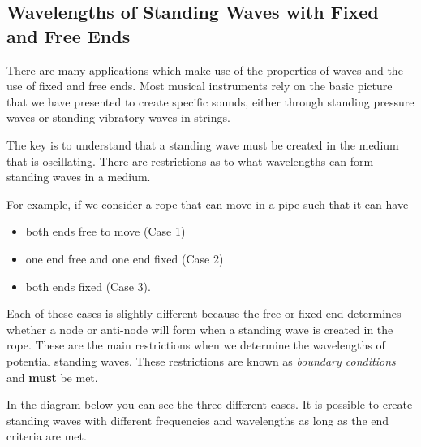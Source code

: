 



\subsection{Wavelengths of Standing Waves with Fixed and Free Ends}
There are many applications which make use of the properties of waves
and the use of fixed and free ends. Most musical instruments rely on
the basic picture that we have presented to create specific sounds,
either through standing pressure waves or standing vibratory waves in
strings.

The key is to understand that a standing wave must be created in the
medium that is oscillating. There are restrictions as to what
wavelengths can form standing waves in a medium.

For example, if we consider a rope that can move in a pipe such that it can have
\begin{itemize}
\item both ends free to move (Case 1)
\item one end free and one end fixed (Case 2)
\item both ends fixed (Case 3).
\end{itemize}

Each of these cases is slightly different because the free or fixed
end determines whether a node or anti-node will form when a standing
wave is created in the rope. These are the main restrictions when we
determine the wavelengths of potential standing waves. These restrictions are known as \textit{boundary conditions} and \textbf{must} be met.

In the diagram below you can see the three different cases. It
is possible to create standing waves with different frequencies and
wavelengths as long as the end criteria are met.

